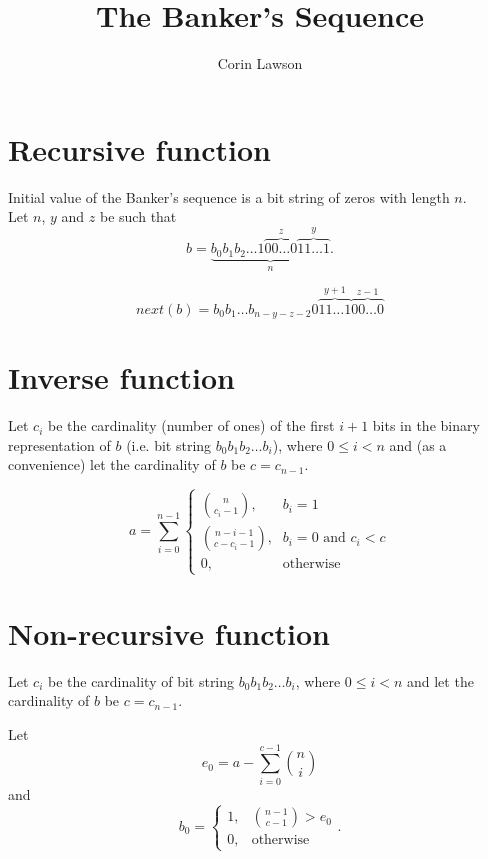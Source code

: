 \documentclass[a4paper,12pt]{article}
\author{Corin Lawson}
\title{The Banker's Sequence}
\begin{document}
\maketitle

\section{Recursive function}

Initial value of the Banker's sequence is a bit string of zeros with length $n$.\\

Let $n$, $y$ and $z$ be such that 
$$b = \underbrace{b_0b_1b_2\ldots1\overbrace{00\ldots0}^z\overbrace{11\ldots1}^y}_n.$$

\begin{equation}
next(b)=
b_0b_1\ldots b_{n-y-z-2}0\overbrace{11\ldots1}^{y+1}\overbrace{00\ldots0}^{z-1}
\end{equation}

\section{Inverse function}

Let $c_i$ be the cardinality (number of ones) of the first $i+1$ bits in the
binary representation of $b$ (i.e. bit string $b_0b_1b_2\ldots b_i$),
where $0 \leq i < n$ and (as a convenience) let the cardinality of $b$ be $c=c_{n-1}$.

\begin{equation}
a = \sum_{i=0}^{n-1}
    \begin{cases}
        \binom{n}{c_i-1}\text{,} & b_i=1\\
        \binom{n-i-1}{c-c_i-1}\text{,} & b_i=0 \text{ and } c_i < c\\
        0, & \text{otherwise}
    \end{cases}
\end{equation}

\pagebreak

\section{Non-recursive function}

Let $c_i$ be the cardinality of bit string $b_0b_1b_2\ldots b_i$,
where $0 \leq i < n$ and let the cardinality of $b$ be $c=c_{n-1}$.

Let
\begin{equation}
    e_0=a-\sum\limits_{i=0}^{c-1}\binom{n}{i}
\end{equation}
and
\begin{equation}
    b_0=\begin{cases}
        1, & \binom{n-1}{c-1} > e_0 \\
        0, & \text{otherwise}
    \end{cases}.
\end{equation}
\end{document}
